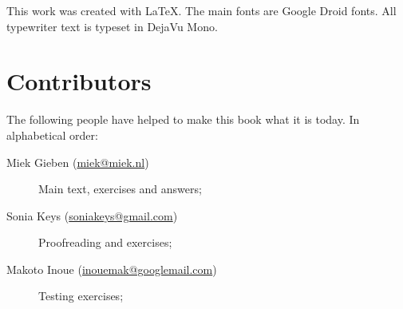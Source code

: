 This work was created with \LaTeX. The main fonts are Google Droid
fonts.
All typewriter text is typeset in DejaVu Mono.

\section{Contributors}
The following people have helped to make this book what it is today.
In alphabetical order:
\begin{description}
\item[Miek Gieben (\url{miek@miek.nl})] 
{Main text, exercises and answers;}
\item[Sonia Keys (\url{soniakeys@gmail.com})] 
{Proofreading and exercises;}
\item[Makoto Inoue (\url{inouemak@googlemail.com})]
{Testing exercises;}

\end{description}
